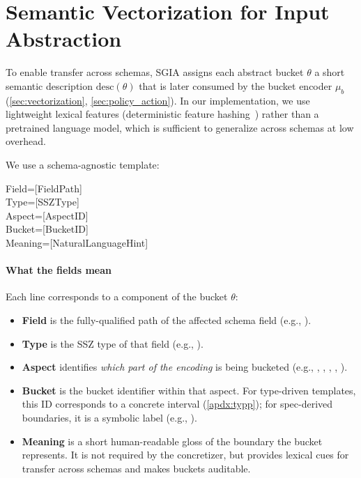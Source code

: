 \section{Semantic Vectorization for Input Abstraction}\label{apdx:template}

To enable transfer across schemas, SGIA assigns each abstract bucket $\theta$ a short semantic description $\text{desc}(\theta)$ that is later consumed by the bucket encoder $\mu_b$ (\autoref{sec:vectorization}, \autoref{sec:policy_action}). In our implementation, we use lightweight lexical features (deterministic feature hashing~\cite{weinberger2009featurehashing}) rather than a pretrained language model, which is sufficient to generalize across schemas at low overhead.

We use a schema-agnostic template:

\begin{mdframed}[
    backgroundcolor=gray!10,
    linecolor=white,
    skipabove=0.5em
    ]
\noindent\ttfamily\small
Field=[FieldPath] \\
Type=[SSZType] \\
Aspect=[AspectID] \\
Bucket=[BucketID] \\
Meaning=[NaturalLanguageHint]
\end{mdframed}

\paragraph{What the fields mean}
Each line corresponds to a component of the bucket $\theta$:
\begin{itemize}
    \item \textbf{Field} is the fully-qualified path of the affected schema field (e.g., ).
    \item \textbf{Type} is the SSZ type of that field (e.g., ).
    \item \textbf{Aspect} identifies \emph{which part of the encoding} is being bucketed (e.g., , , , , ).
    \item \textbf{Bucket} is the bucket identifier within that aspect. For type-driven templates, this ID corresponds to a concrete interval (\autoref{apdx:typp}); for spec-derived boundaries, it is a symbolic label (e.g., ).
    \item \textbf{Meaning} is a short human-readable gloss of the boundary the bucket represents. It is not required by the concretizer, but provides lexical cues for transfer across schemas and makes buckets auditable.
\end{itemize}

